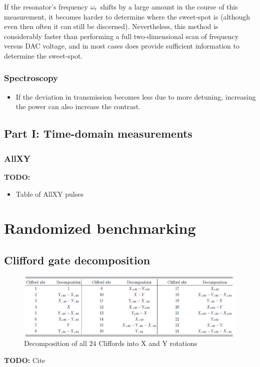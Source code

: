         If the resonator's frequency $\omega_\text{r}$ shifts by a large amount in the course of this measurement, it becomes harder to determine where the sweet-spot is (although even then often it can still be discerned). Nevertheless, this method is considerably faster than performing a full two-dimensional scan of frequency versus DAC voltage, and in most cases does provide sufficient information to determine the sweet-spot.


      \subsubsection{Spectroscopy}
        \begin{itemize}
          \item If the deviation in transmission becomes less due to more detuning, increasing the power can also increase the contrast.
        \end{itemize}
    \subsection{Part I: Time-domain measurements}
      \subsubsection{AllXY}
        \label{ssec:AllXY}
        \textbf{TODO:}
        \begin{itemize}
          \item Table of AllXY pulses
        \end{itemize}
  \section{Randomized benchmarking}
    \subsection{Clifford gate decomposition}
      \label{ssec:Clifford gate decomposition}

      \begin{figure}[tb]
        \centering
        \includegraphics[width=\textwidth]{../Figures/Clifford decomposition.png}
        \caption{Decomposition of all $24$ Cliffords into X and Y rotations}
        \label{fig:Clifford decomposition}
      \end{figure}
      \textbf{TODO:} Cite

